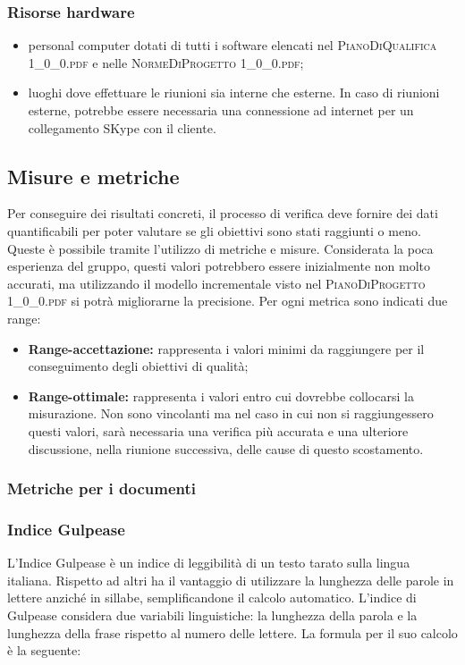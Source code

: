 		\subsubsection{Risorse hardware}
		\begin{itemize}
			\item personal computer dotati di tutti i software elencati nel \textsc{PianoDiQualifica 1\_0\_0.pdf} e nelle \textsc{NormeDiProgetto 1\_0\_0.pdf};
			\item luoghi dove effettuare le riunioni sia interne che esterne. In caso di riunioni esterne, potrebbe essere necessaria una connessione ad internet per un collegamento SKype con il cliente.
		\end{itemize}
		
						
	\subsection{Misure e metriche}
		Per conseguire dei risultati concreti, il processo di verifica deve fornire dei dati quantificabili per poter valutare se gli obiettivi sono stati raggiunti o meno. Queste è possibile tramite l’utilizzo di metriche e misure. Considerata la poca esperienza del gruppo, questi valori potrebbero essere inizialmente non molto accurati, ma utilizzando il modello incrementale visto nel \textsc{PianoDiProgetto 1\_0\_0.pdf} si potrà migliorarne la precisione.
		Per ogni metrica sono indicati due range:
		\begin{itemize}
			\item \textbf{Range-accettazione: }rappresenta i valori minimi da raggiungere per il conseguimento degli obiettivi di qualità;
			\item \textbf{Range-ottimale: }rappresenta i valori entro cui dovrebbe collocarsi la misurazione. Non sono vincolanti ma nel caso in cui non si raggiungessero questi valori, sarà necessaria una verifica più accurata e una ulteriore discussione, nella riunione successiva, delle cause di questo scostamento.
		\end{itemize}
	
		\subsubsection{Metriche per i documenti}
		
		\subsubsection{Indice Gulpease }
		L'Indice Gulpease è un indice di leggibilità di un testo tarato sulla lingua italiana. Rispetto ad altri ha il vantaggio di utilizzare la lunghezza delle parole in lettere anziché in sillabe, semplificandone il calcolo automatico.
		L'indice di Gulpease considera due variabili linguistiche: la lunghezza della parola e la lunghezza della frase rispetto al numero delle lettere.
		La formula per il suo calcolo è la seguente:
		
